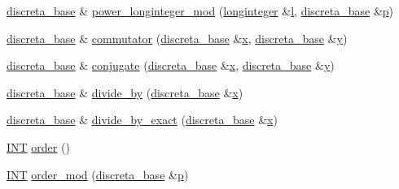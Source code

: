\begin{DoxyCompactItemize}
\item 
\mbox{\hyperlink{classdiscreta__base}{discreta\+\_\+base}} \& \mbox{\hyperlink{classdiscreta__base_a13cf1612186baa2104f55978cbf56873}{power\+\_\+longinteger\+\_\+mod}} (\mbox{\hyperlink{classlonginteger}{longinteger}} \&\mbox{\hyperlink{alphabet2_8_c_a89606eca6b563ec68d2da2e84657736f}{l}}, \mbox{\hyperlink{classdiscreta__base}{discreta\+\_\+base}} \&\mbox{\hyperlink{alphabet2_8_c_a533391314665d6bf1b5575e9a9cd8552}{p}})
\item 
\mbox{\hyperlink{classdiscreta__base}{discreta\+\_\+base}} \& \mbox{\hyperlink{classdiscreta__base_a1d0bb4144e3eb15aaf877a0cea656c00}{commutator}} (\mbox{\hyperlink{classdiscreta__base}{discreta\+\_\+base}} \&\mbox{\hyperlink{alphabet2_8_c_a6150e0515f7202e2fb518f7206ed97dc}{x}}, \mbox{\hyperlink{classdiscreta__base}{discreta\+\_\+base}} \&\mbox{\hyperlink{alphabet2_8_c_a0a2f84ed7838f07779ae24c5a9086d33}{y}})
\item 
\mbox{\hyperlink{classdiscreta__base}{discreta\+\_\+base}} \& \mbox{\hyperlink{classdiscreta__base_a463f1481dd1a3ab42deb6162e25ba725}{conjugate}} (\mbox{\hyperlink{classdiscreta__base}{discreta\+\_\+base}} \&\mbox{\hyperlink{alphabet2_8_c_a6150e0515f7202e2fb518f7206ed97dc}{x}}, \mbox{\hyperlink{classdiscreta__base}{discreta\+\_\+base}} \&\mbox{\hyperlink{alphabet2_8_c_a0a2f84ed7838f07779ae24c5a9086d33}{y}})
\item 
\mbox{\hyperlink{classdiscreta__base}{discreta\+\_\+base}} \& \mbox{\hyperlink{classdiscreta__base_aa3f9d43fab5e6240202fbd7c1f5e3e74}{divide\+\_\+by}} (\mbox{\hyperlink{classdiscreta__base}{discreta\+\_\+base}} \&\mbox{\hyperlink{alphabet2_8_c_a6150e0515f7202e2fb518f7206ed97dc}{x}})
\item 
\mbox{\hyperlink{classdiscreta__base}{discreta\+\_\+base}} \& \mbox{\hyperlink{classdiscreta__base_a14ea31dd075b20644457db08319389ef}{divide\+\_\+by\+\_\+exact}} (\mbox{\hyperlink{classdiscreta__base}{discreta\+\_\+base}} \&\mbox{\hyperlink{alphabet2_8_c_a6150e0515f7202e2fb518f7206ed97dc}{x}})
\item 
\mbox{\hyperlink{galois_8h_a09fddde158a3a20bd2dcadb609de11dc}{I\+NT}} \mbox{\hyperlink{classdiscreta__base_a4ce6b54534e4882c48c051c03ac76e52}{order}} ()
\item 
\mbox{\hyperlink{galois_8h_a09fddde158a3a20bd2dcadb609de11dc}{I\+NT}} \mbox{\hyperlink{classdiscreta__base_aee39628b4299a335baca784802ac0f3c}{order\+\_\+mod}} (\mbox{\hyperlink{classdiscreta__base}{discreta\+\_\+base}} \&\mbox{\hyperlink{alphabet2_8_c_a533391314665d6bf1b5575e9a9cd8552}{p}})
\item 

\end{DoxyCompactItemize}
